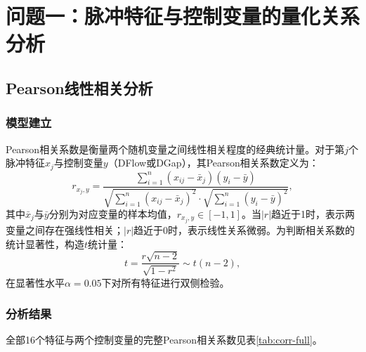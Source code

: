 \documentclass[UTF8,a4paper,12pt]{ctexart}
\begin{document}
\section{问题一：脉冲特征与控制变量的量化关系分析}

\subsection{Pearson线性相关分析}

\subsubsection{模型建立}

Pearson相关系数是衡量两个随机变量之间线性相关程度的经典统计量。对于第$j$个脉冲特征$x_j$与控制变量$y$（DFlow或DGap），其Pearson相关系数定义为：
\begin{equation}
r_{x_j,y}=\frac{\displaystyle\sum_{i=1}^{n}(x_{ij}-\bar{x}_j)(y_i-\bar{y})}{\displaystyle\sqrt{\sum_{i=1}^{n}(x_{ij}-\bar{x}_j)^2}\cdot\sqrt{\sum_{i=1}^{n}(y_i-\bar{y})^2}},
\label{eq:pearson}
\end{equation}
其中$\bar{x}_j$与$\bar{y}$分别为对应变量的样本均值，$r_{x_j,y}\in[-1,1]$。当$|r|$趋近于1时，表示两变量之间存在强线性相关；$|r|$趋近于0时，表示线性关系微弱。为判断相关系数的统计显著性，构造$t$统计量：
\begin{equation}
t=\frac{r\sqrt{n-2}}{\sqrt{1-r^2}}\sim t(n-2),
\end{equation}
在显著性水平$\alpha=0.05$下对所有特征进行双侧检验。

\subsubsection{分析结果}

全部16个特征与两个控制变量的完整Pearson相关系数见表\ref{tab:corr-full}。
\end{document}
